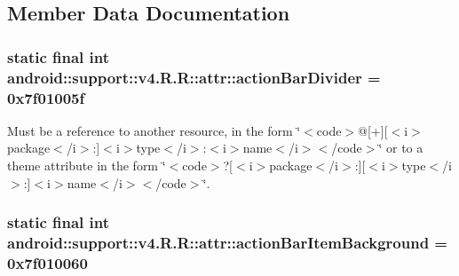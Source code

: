 \subsection{Member Data Documentation}
\hypertarget{classandroid_1_1support_1_1v4_1_1_r_1_1attr_8c4acfa0a2d20f2f77ebfb6ca55f2066}{
\subsubsection[{actionBarDivider}]{\setlength{\rightskip}{0pt plus 5cm}static final int android::support::v4.R.R::attr::actionBarDivider = 0x7f01005f}}
\label{classandroid_1_1support_1_1v4_1_1_r_1_1attr_8c4acfa0a2d20f2f77ebfb6ca55f2066}


Must be a reference to another resource, in the form \char`\"{}$<$code$>$@\mbox{[}+\mbox{]}\mbox{[}$<$i$>$package$<$/i$>$:\mbox{]}$<$i$>$type$<$/i$>$:$<$i$>$name$<$/i$>$$<$/code$>$\char`\"{} or to a theme attribute in the form \char`\"{}$<$code$>$?\mbox{[}$<$i$>$package$<$/i$>$:\mbox{]}\mbox{[}$<$i$>$type$<$/i$>$:\mbox{]}$<$i$>$name$<$/i$>$$<$/code$>$\char`\"{}. \hypertarget{classandroid_1_1support_1_1v4_1_1_r_1_1attr_57fb7f4a4554800c2dcfcdc8810cda10}{
\subsubsection[{actionBarItemBackground}]{\setlength{\rightskip}{0pt plus 5cm}static final int android::support::v4.R.R::attr::actionBarItemBackground = 0x7f010060}}
\label{classandroid_1_1support_1_1v4_1_1_r_1_1attr_57fb7f4a4554800c2dcfcdc8810cda10}


